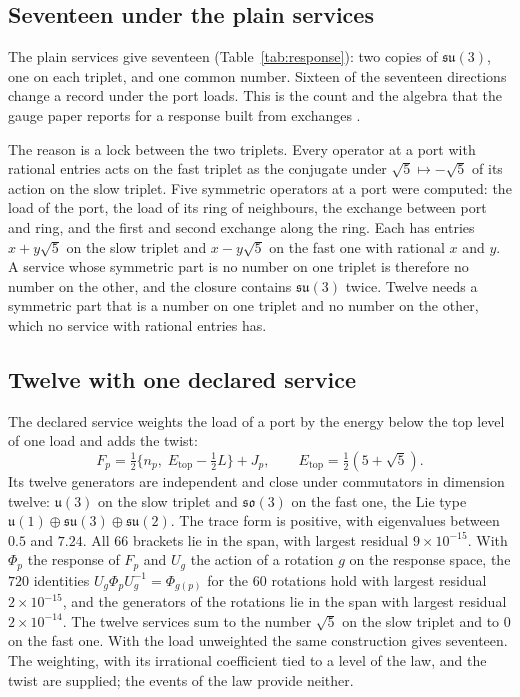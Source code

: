 \documentclass[11pt]{article}
\theoremstyle{definition}
\theoremstyle{remark}
\theoremstyle{plain}
\begin{document}
\subsection{Seventeen under the plain services}

The plain services give seventeen (Table~\ref{tab:response}): two copies of
$\mathfrak{su}(3)$, one on each triplet, and one common number. Sixteen of
the seventeen directions change a record under the port loads. This is the
count and the algebra that the gauge paper reports for a response built
from exchanges \cite{ophgauge}.

The reason is a lock between the two triplets. Every operator at a port
with rational entries acts on the fast triplet as the conjugate under
$\sqrt5\mapsto-\sqrt5$ of its action on the slow triplet. Five symmetric
operators at a port were computed: the load of the port, the load of its
ring of neighbours, the exchange between port and ring, and the first and
second exchange along the ring. Each has entries $x+y\sqrt5$ on the slow
triplet and $x-y\sqrt5$ on the fast one with rational $x$ and $y$. A service
whose symmetric part is no number on one triplet is therefore no number on
the other, and the closure contains $\mathfrak{su}(3)$ twice. Twelve needs
a symmetric part that is a number on one triplet and no number on the
other, which no service with rational entries has.

\subsection{Twelve with one declared service}

The declared service weights the load of a port by the energy below the top
level of one load and adds the twist:
\begin{equation}
F_p=\tfrac12\bigl\{n_p,\;E_{\mathrm{top}}-\tfrac12L\bigr\}+J_p,\qquad
E_{\mathrm{top}}=\tfrac12(5+\sqrt5).
\label{eq:service}
\end{equation}
Its twelve generators are independent and close under commutators in
dimension twelve: $\mathfrak u(3)$ on the slow triplet and
$\mathfrak{so}(3)$ on the fast one, the Lie type
$\mathfrak u(1)\oplus\mathfrak{su}(3)\oplus\mathfrak{su}(2)$. The trace form
is positive, with eigenvalues between $0.5$ and $7.24$. All $66$ brackets
lie in the span, with largest residual $9\times10^{-15}$. With $\Phi_p$
the response of $F_p$ and $U_g$ the action of a rotation $g$ on the
response space, the $720$ identities
$U_g\Phi_pU_g^{-1}=\Phi_{g(p)}$ for the $60$ rotations hold with largest
residual $2\times10^{-15}$, and the generators of the rotations lie in the
span with largest residual $2\times10^{-14}$. The twelve services sum to
the number $\sqrt5$ on the slow triplet and to $0$ on the fast one. With
the load unweighted the same construction gives seventeen. The weighting, with its
irrational coefficient tied to a level of the law, and the twist are
supplied; the events of the law provide neither.
\end{document}
